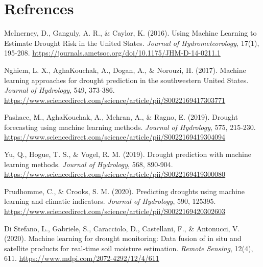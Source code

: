 \documentclass{article}
\begin{document}
\section{Refrences}
\begin{thebibliography}{9}
McInerney, D., Ganguly, A. R., \& Caylor, K. (2016). Using Machine Learning to Estimate Drought Risk in the United States. \textit{Journal of Hydrometeorology}, 17(1), 195-208. \url{https://journals.ametsoc.org/doi/10.1175/JHM-D-14-0211.1}

Nghiem, L. X., AghaKouchak, A., Dogan, A., \& Norouzi, H. (2017). Machine learning approaches for drought prediction in the southwestern United States. \textit{Journal of Hydrology}, 549, 373-386. \url{https://www.sciencedirect.com/science/article/pii/S0022169417303771}

Pashaee, M., AghaKouchak, A., Mehran, A., \& Ragno, E. (2019). Drought forecasting using machine learning methods. \textit{Journal of Hydrology}, 575, 215-230. \url{https://www.sciencedirect.com/science/article/pii/S0022169419304094}

Yu, Q., Hogue, T. S., \& Vogel, R. M. (2019). Drought prediction with machine learning methods. \textit{Journal of Hydrology}, 568, 890-904. \url{https://www.sciencedirect.com/science/article/pii/S0022169419300080}

Prudhomme, C., \& Crooks, S. M. (2020). Predicting droughts using machine learning and climatic indicators. \textit{Journal of Hydrology}, 590, 125395. \url{https://www.sciencedirect.com/science/article/pii/S0022169420302603}

Di Stefano, L., Gabriele, S., Caracciolo, D., Castellani, F., \& Antonucci, V. (2020). Machine learning for drought monitoring: Data fusion of in situ and satellite products for real-time soil moisture estimation. \textit{Remote Sensing}, 12(4), 611. \url{https://www.mdpi.com/2072-4292/12/4/611}
\end{thebibliography}
\end{document}
